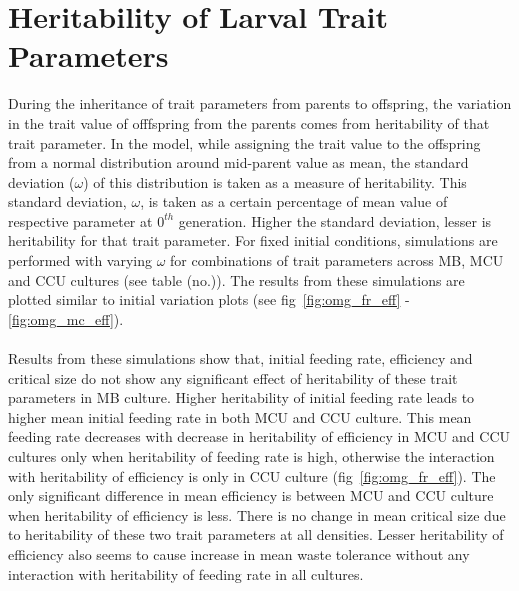 \section{Heritability of Larval Trait Parameters}
During the inheritance of trait parameters from parents to offspring, the variation in the trait value of offfspring from the parents comes from heritability of that trait parameter. In the model, while assigning the trait value to the offspring from a normal distribution around mid-parent value as mean, the standard deviation ($\omega$) of this distribution is taken as a measure of heritability. This standard deviation, $\omega$, is taken as a certain percentage of mean value of respective parameter at $0^{th}$ generation. Higher the standard deviation, lesser is heritability for that trait parameter. For fixed initial conditions, simulations are performed with varying $\omega$ for combinations of trait parameters across MB, MCU and CCU cultures (see table (no.)). The results from these simulations are plotted similar to initial variation plots (see fig~\ref{fig:omg_fr_eff} - \ref{fig:omg_mc_eff}).\\\\
Results from these simulations show that, initial feeding rate, efficiency and critical size do not show any significant effect of heritability of these trait parameters in MB culture. Higher heritability of initial feeding rate leads to higher mean initial feeding rate in both MCU and CCU culture. This mean feeding rate decreases with decrease in heritability of efficiency in MCU and CCU cultures only when heritability of feeding rate is high, otherwise the interaction with heritability of efficiency is only in CCU culture (fig~\ref{fig:omg_fr_eff}). The only significant difference in mean efficiency is between MCU and CCU culture when heritability of efficiency is less. There is no change in mean critical size due to heritability of these two trait parameters at all densities. Lesser heritability of efficiency also seems to cause increase in mean waste tolerance without any interaction with heritability of feeding rate in all cultures.
